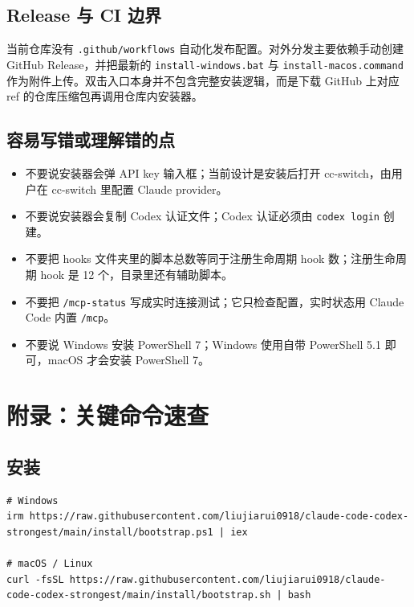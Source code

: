 \documentclass[11pt,a4paper]{ctexbook}
\begin{document}
\section{Release 与 CI 边界}

当前仓库没有 \texttt{.github/workflows} 自动化发布配置。对外分发主要依赖手动创建 GitHub Release，并把最新的 \texttt{install-windows.bat} 与 \texttt{install-macos.command} 作为附件上传。双击入口本身并不包含完整安装逻辑，而是下载 GitHub 上对应 ref 的仓库压缩包再调用仓库内安装器。

\section{容易写错或理解错的点}

\begin{itemize}[leftmargin=2em]
  \item 不要说安装器会弹 API key 输入框；当前设计是安装后打开 cc-switch，由用户在 cc-switch 里配置 Claude provider。
  \item 不要说安装器会复制 Codex 认证文件；Codex 认证必须由 \texttt{codex login} 创建。
  \item 不要把 hooks 文件夹里的脚本总数等同于注册生命周期 hook 数；注册生命周期 hook 是 12 个，目录里还有辅助脚本。
  \item 不要把 \texttt{/mcp-status} 写成实时连接测试；它只检查配置，实时状态用 Claude Code 内置 \texttt{/mcp}。
  \item 不要说 Windows 安装 PowerShell 7；Windows 使用自带 PowerShell 5.1 即可，macOS 才会安装 PowerShell 7。
\end{itemize}

\chapter{附录：关键命令速查}

\section{安装}

\begin{lstlisting}[language={}]
# Windows
irm https://raw.githubusercontent.com/liujiarui0918/claude-code-codex-strongest/main/install/bootstrap.ps1 | iex

# macOS / Linux
curl -fsSL https://raw.githubusercontent.com/liujiarui0918/claude-code-codex-strongest/main/install/bootstrap.sh | bash
\end{lstlisting}
\end{document}
